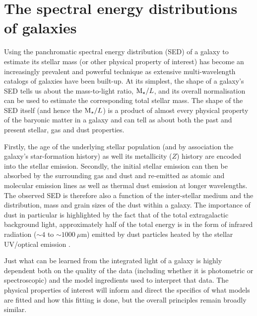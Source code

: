 \section{The spectral energy distributions of galaxies}\label{sec:intro-sed}
Using the panchromatic spectral energy distribution (SED) of a galaxy to estimate its stellar mass (or other physical property of interest) has become an increasingly prevalent and powerful technique as extensive multi-wavelength catalogs of galaxies have been built-up. At its simplest, the shape of a galaxy's SED tells us about the mass-to-light ratio, $\text{M}_{\star}/L$, and its overall normalisation can be used to estimate the corresponding total stellar mass. The shape of the SED itself (and hence the $\text{M}_{\star}/L$) is a product of almost every physical property of the baryonic matter in a galaxy and can tell as about both the past and present stellar, gas and dust properties.

Firstly, the age of the underlying stellar population (and by association the galaxy's star-formation history) as well its metallicity ($Z$) history are encoded into the stellar emission. Secondly, the initial stellar emission can then be absorbed by the surrounding gas and dust and re-emitted as atomic and molecular emission lines as well as thermal dust emission at longer wavelengths. The observed SED is therefore also a function of the inter-stellar medium and the distribution, mass and grain sizes of the dust within a galaxy. The importance of dust in particular is highlighted by the fact that of the total extragalactic background light, approximately half of the total energy is in the form of infrared radiation ($\sim 4$ to $\sim 1000~\mu$m) emitted by dust particles heated by the stellar UV/optical emission \citep{Hauser:2001fs}. 


Just what can be learned from the integrated light of a galaxy is highly dependent both on the quality of the data (including whether it is photometric or spectroscopic) and the model ingredients used to interpret that data. The physical properties of interest will inform and direct the specifics of what models are fitted and how this fitting is done, but the overall principles remain broadly similar.

